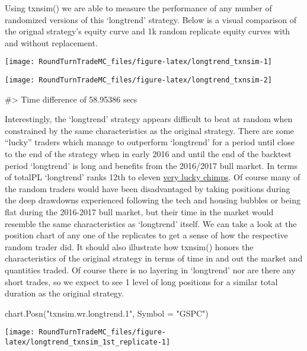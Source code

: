 Using txnsim() we are able to measure the performance of any number of
randomized versions of this `longtrend' strategy. Below is a visual
comparison of the orignal strategy's equity curve and 1k random
replicate equity curves with and without replacement.

\begin{Schunk}


\begin{center}\texttt{[image: RoundTurnTradeMC\_files/figure-latex/longtrend\_txnsim-1]} \end{center}



\begin{center}\texttt{[image: RoundTurnTradeMC\_files/figure-latex/longtrend\_txnsim-2]} \end{center}

\begin{Soutput}
#> Time difference of 58.95386 secs
\end{Soutput}
\end{Schunk}

Interestingly, the `longtrend' strategy appears difficult to beat at
random when constrained by the same characteristics as the original
strategy. There are some ``lucky'' traders which manage to outperform
`longtrend' for a period until close to the end of the strategy when in
early 2016 and until the end of the backtest period `longtrend' is long
and benefits from the 2016/2017 bull market. In terms of totalPL
`longtrend' ranks 12th to eleven
\href{http://www.followingthetrend.com/2016/04/you-cant-beat-all-the-chimps/}{very
lucky chimps}. Of course many of the random traders would have been
disadvantaged by taking positions during the deep drawdowns experienced
following the tech and housing bubbles or being flat during the
2016-2017 bull market, but their time in the market would resemble the
same characteristics as `longtrend' itself. We can take a look at the
position chart of any one of the replicates to get a sense of how the
respective random trader did. It should also illustrate how txnsim()
honors the characteristics of the original strategy in terms of time in
and out the market and quantities traded. Of course there is no layering
in `longtrend' nor are there any short trades, so we expect to see 1
level of long positions for a similar total duration as the original
strategy.

\begin{Schunk}
\begin{Sinput}
chart.Posn("txnsim.wr.longtrend.1", Symbol = "GSPC")
\end{Sinput}


\begin{center}\texttt{[image: RoundTurnTradeMC\_files/figure-latex/longtrend\_txnsim\_1st\_replicate-1]} \end{center}

\end{Schunk}


